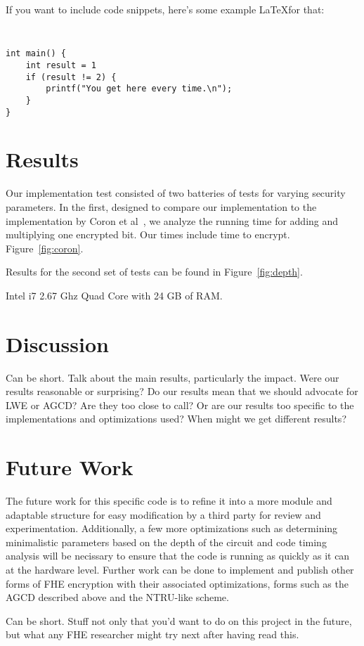 \documentclass[letterpaper,twocolumn,10pt]{article}
\begin{document}
If you want to include code snippets, here's some example \LaTeX for that:

{\tt \small
\begin{verbatim}
int main() {
    int result = 1
    if (result != 2) {
        printf("You get here every time.\n");
    }
}
\end{verbatim}
}


\section{Results}
Our implementation test consisted of two batteries of tests for varying security parameters. In the first, designed to compare our implementation to the implementation by Coron et al~\cite{CNT}, we analyze the running time for adding and multiplying one encrypted bit. Our times include time to encrypt. Figure~\ref{fig:coron}.

Results for the second set of tests can be found in Figure~\ref{fig:depth}.

Intel i7 2.67 Ghz Quad Core with 24 GB of RAM.


\section{Discussion}
Can be short. Talk about the main results, particularly the impact. Were our results reasonable or surprising? Do our results mean that we should advocate for LWE or AGCD? Are they too close to call? Or are our results too specific to the implementations and optimizations used? When might we get different results?


\section{Future Work}
The future work for this specific code is to refine it into a more module and adaptable structure for easy modification by a third party for review and experimentation. Additionally, a few more optimizations such as determining minimalistic parameters based on the depth of the circuit and code timing analysis will be necissary to ensure that the code is running as quickly as it can at the hardware level. Further work can be done to implement and publish other forms of FHE encryption with their associated optimizations, forms such as the AGCD described above and the NTRU-like scheme.

Can be short. Stuff not only that you'd want to do on this project in the future, but what any FHE researcher might try next after having read this.
\end{document}
